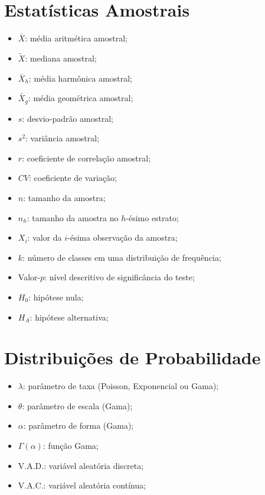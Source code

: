 \begin{refsection}

\section*{Estatísticas Amostrais}

\begin{itemize}
\item $\bar{X}$: média aritmética amostral;
\item $\widetilde{X}$: mediana amostral;
\item $\bar{X}_{h}$: média harmônica amostral;
\item $\bar{X}_{g}$: média geométrica amostral;
\item $s$: desvio-padrão amostral;
\item $s^2$: variância amostral;
\item $r$: coeficiente de correlação amostral;
\item $CV$: coeficiente de variação;
\item $n$: tamanho da amostra;
\item $n_{h}$: tamanho da amostra no $h$-ésimo estrato;
\item $X_{i}$: valor da $i$-ésima observação da amostra;
\item $k$: número de classes em uma distribuição de frequência;
\item Valor-$p$: nível descritivo de significância do teste;
\item $H_{0}$: hipótese nula;
\item $H_{A}$: hipótese alternativa;
\end{itemize}


\section*{Distribuições de Probabilidade}

\begin{itemize}
\item $\lambda$: parâmetro de taxa (Poisson, Exponencial ou Gama);
\item $\theta$: parâmetro de escala (Gama);
\item $\alpha$: parâmetro de forma (Gama);
\item $\Gamma(\alpha)$: função Gama;
\item V.A.D.: variável aleatória discreta;
\item V.A.C.: variável aleatória contínua;
\end{itemize}


\end{refsection}

